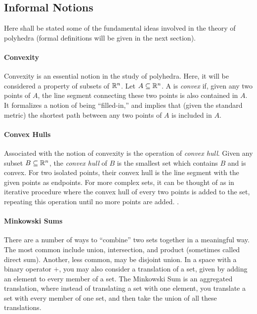 
\subsection{Informal Notions}

Here shall be stated some of the fundamental ideas involved in the theory of polyhedra (formal definitions will be given in the next section).

\paragraph{Convexity} Convexity is an essential notion in the study of polyhedra.  Here, it will be considered a property of subsets of $\mathbb{R}^n$.  Let $A \subseteq \mathbb{R}^n$.  A is \textit{convex} if, given any two points of $A$, the line segment connecting these two points is also contained in $A$.  It formalizes a notion of being ``filled-in,'' and implies that (given the standard metric) the shortest path between any two points of $A$ is included in $A$.  

\paragraph{Convex Hulls} Associated with the notion of convexity is the operation of \textit{convex hull}.  Given any subset $B \subseteq \mathbb{R}^n$, the \textit{convex hull} of $B$ is the smallest set which contains $B$ and is convex.  For two isolated points, their convex hull is the line segment with the given points as endpoints.  For more complex sets, it can be thought of as in iterative procedure where the convex hull of every two points is added to the set, repeating this operation until no more points are added. .

\paragraph{Minkowski Sums}  There are a number of ways to ``combine'' two sets together in a meaningful way.  The most common include union, intersection, and product (sometimes called direct sum).  Another, less common, may be disjoint union.  In a space with a binary operator $+$, you may also consider a translation of a set, given by adding an element to every member of a set.  The Minkowski Sum is an aggregated translation, where instead of translating a set with one element, you translate a set with every member of one set, and then take the union of all these translations.

